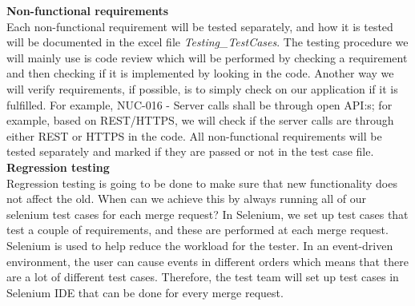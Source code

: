 \noindent\textbf{Non-functional requirements}\\
Each non-functional requirement will be tested separately, and how it is tested will be documented in the excel file \textit{Testing\_TestCases}. The testing procedure we will mainly use is code review which will be performed by checking a requirement and then checking if it is implemented by looking in the code. Another way we will verify requirements, if possible, is to simply check on our application if it is fulfilled. For example, NUC-016 - Server calls shall be through open API:s; for example, based on REST/HTTPS, we will check if the server calls are through either REST or HTTPS in the code. All non-functional requirements will be tested separately and marked if they are passed or not in the test case file. \\

\noindent \textbf{Regression testing}\\
Regression testing is going to be done to make sure that new functionality does not affect the old. When can we achieve this by always running all of our selenium test cases for each merge request? In Selenium, we set up test cases that test a couple of requirements, and these are performed at each merge request. Selenium is used to help reduce the workload for the tester. In an event-driven environment, the user can cause events in different orders which means that there are a lot of different test cases. Therefore, the test team will set up test cases in Selenium IDE that can be done for every merge request.\\

